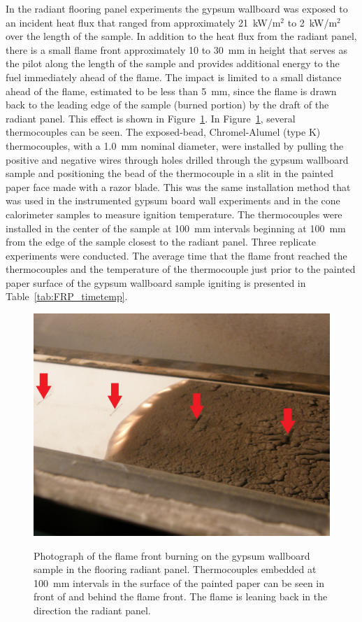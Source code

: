 \documentclass[twoside]{uocthesis}
\begin{document}
{In the radiant flooring panel experiments the gypsum wallboard was exposed to an incident heat flux that ranged from approximately 21~kW/m$^2$ to 2~kW/m$^2$ over the length of the sample. In addition to the heat flux from the radiant panel, there is a small flame front approximately 10 to 30~mm in height that serves as the pilot along the length of the sample and provides additional energy to the fuel immediately ahead of the flame.  The impact is limited to a small distance ahead of the flame, estimated to be less than 5~mm, since the flame is drawn back to the leading edge of the sample (burned portion) by the draft of the radiant panel.  This effect is shown in Figure~\ref{FRP_flamefront_arrows}. In Figure~\ref{FRP_flamefront_arrows}, several thermocouples can be seen. The exposed-bead, Chromel-Alumel (type K) thermocouples, with a 1.0~mm nominal diameter, were installed by pulling the positive and negative wires through holes drilled through the gypsum wallboard sample and positioning the bead of the thermocouple in a slit in the painted paper face made with a razor blade.  This was the same installation method that was used in the instrumented gypsum board wall experiments and in the cone calorimeter samples to measure ignition temperature.  The thermocouples were installed in the center of the sample at 100~mm intervals beginning at 100~mm from the edge of the sample closest to the radiant panel.  Three replicate experiments were conducted.  The average time that the flame front reached the thermocouples and the temperature of the thermocouple just prior to the painted paper surface of the gypsum wallboard sample igniting is presented in Table~\ref{tab:FRP_timetemp}.  

\begin{figure}
	\centering
	\includegraphics[width=\textwidth]{../Figures/FRP_flamefront_arrows} \\
	\caption[Photograph of the flame front burning on the gypsum wallboard sample in the flooring radiant panel] {Photograph of the flame front burning on the gypsum wallboard sample in the flooring radiant panel. Thermocouples embedded at 100~mm intervals in the surface of the painted paper can be seen in front of and behind the flame front. The flame is leaning back in the direction the radiant panel.}
	\label{FRP_flamefront_arrows}
\end{figure}

}
\end{document}
